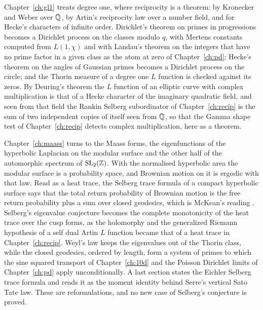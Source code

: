 Chapter~\ref{ch:gl1} treats degree one, where reciprocity is a theorem: by Kronecker and Weber over $\mathbb{Q}$, by Artin's reciprocity law over a number field, and for Hecke's characters of infinite order. Dirichlet's theorem on primes in progressions becomes a Dirichlet process on the classes modulo $q$, with Mertens constants computed from $L(1,\chi)$ and with Landau's theorem on the integers that have no prime factor in a given class as the atom at zero of Chapter~\ref{ch:pd}; Hecke's theorem on the angles of Gaussian primes becomes a Dirichlet process on the circle; and the Thorin measure of a degree one $L$ function is checked against its zeros. By Deuring's theorem the $L$ function of an elliptic curve with complex multiplication is that of a Hecke character of the imaginary quadratic field, and seen from that field the Rankin Selberg subordinator of Chapter~\ref{ch:recip} is the sum of two independent copies of itself seen from $\mathbb{Q}$, so that the Gamma shape test of Chapter~\ref{ch:recip} detects complex multiplication, here as a theorem.

Chapter~\ref{ch:maass} turns to the Maass forms, the eigenfunctions of the hyperbolic Laplacian on the modular surface and the other half of the automorphic spectrum of $\mathrm{SL}_2(\mathbb{Z})$. With the normalised hyperbolic area the modular surface is a probability space, and Brownian motion on it is ergodic with that law. Read as a heat trace, the Selberg trace formula of a compact hyperbolic surface says that the total return probability of Brownian motion is the free return probability plus a sum over closed geodesics, which is McKean's reading \cite{mckean1972}. Selberg's eigenvalue conjecture becomes the complete monotonicity of the heat trace over the cusp forms, as the holomorphy and the generalized Riemann hypothesis of a self dual Artin $L$ function became that of a heat trace in Chapter~\ref{ch:recip}. Weyl's law keeps the eigenvalues out of the Thorin class, while the closed geodesics, ordered by length, form a system of primes to which the sine squared transport of Chapter~\ref{ch:10d} and the Poisson Dirichlet limits of Chapter~\ref{ch:pd} apply unconditionally. A last section states the Eichler Selberg trace formula and reads it as the moment identity behind Serre's vertical Sato Tate law. These are reformulations, and no new case of Selberg's conjecture is proved.

